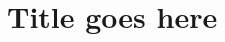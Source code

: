 \documentclass[a4paper, 11pt]{scrreprt}
\begin{document}
  \setcounter{page}{1}
  \section*{Title goes here}
\end{document}
